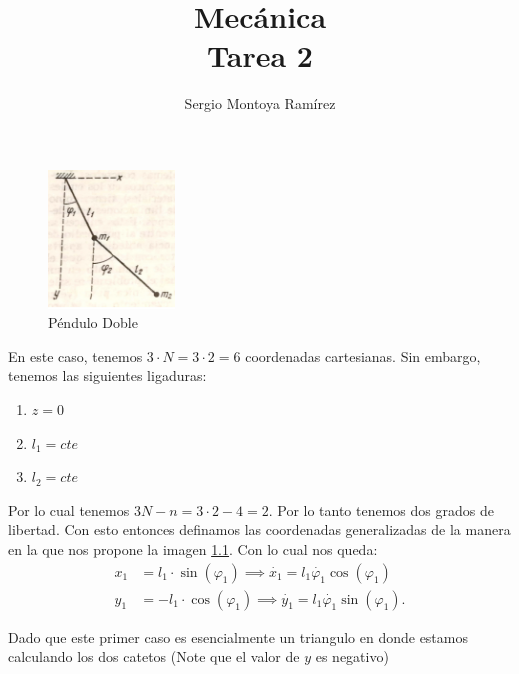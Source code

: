 \documentclass{report}
\title{\Huge{Mecánica}\\Tarea 2}
\author{\huge{Sergio Montoya Ramírez}}
\date{}
\begin{document}
\maketitle
\newpage%
\tableofcontents
\pagebreak

\chapter{}

\begin{figure}[H]
  \centering
  \includegraphics[width=0.3\textwidth]{img/pregunta_1.png}
  \caption{Péndulo Doble}
  \label{fig:pregunta_1}
\end{figure}

En este caso, tenemos $3 \cdot N = 3\cdot 2 = 6$ coordenadas cartesianas. Sin embargo, tenemos las siguientes ligaduras:
\begin{enumerate}
  \item $z = 0$
  \item  $l_1 = cte$
  \item $l_2 = cte$
\end{enumerate}

Por lo cual tenemos $3N - n = 3 \cdot 2 - 4 = 2$. Por lo tanto tenemos dos grados de libertad. Con esto entonces definamos las coordenadas generalizadas de la manera en la que nos propone la imagen \ref{fig:pregunta_1}. Con lo cual nos queda:
\begin{align*}
  x_1 &= l_1\cdot \sin\left(\varphi_1\right)  \implies \dot{x_1} = l_1 \dot{\varphi_1} \cos\left( \varphi_1 \right) \\
  y_1 &= -l_1\cdot \cos\left(\varphi_1\right) \implies \dot{y_1} = l_1\dot{\varphi_1}\sin\left( \varphi_1 \right) 
.\end{align*}

Dado que este primer caso es esencialmente un triangulo en donde estamos calculando los dos catetos (Note que el valor de $y$ es negativo)
\end{document}
